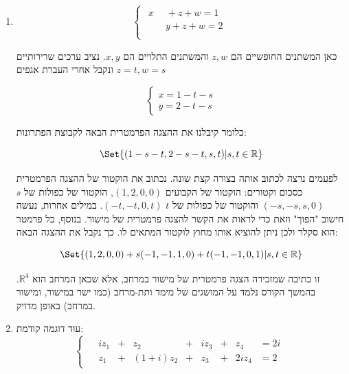 \documentclass[
  hebrew,
  12pt,
  a4paper,
  oneside]{book}
\theoremstyle{definition}
\theoremstyle{remark}
\theoremstyle{plain}
\theoremstyle{remark}
\begin{document}
\begin{example}
\begin{enumerate}
  זו ממ"ל יחסית פשוטה בארבעה משתנים \(x,y,z,w\). אפשר להתייחס ל-\(w\)
  כמשתנה חופשי ואז כל שאר המשתנים תלויים בו. נשתמש בפרמטר \(t\), נציב
  \(w=t\) במשוואות ואז נחסיר \(t\) מכל אגף בכל משוואה. כך נקבל
  \[\begin{cases}
  x=1-t\\
  y=2-t\\
  z=3-t
  \end{cases}\]

  לכן קבוצת הפתרונות של הממ"ל היא
  \[.\Set{(1-t,2-t,3-t,t)|t\in\mathbb R}=\Set{(1,2,3,0)+t(-1,-1,-1,1)|t\in\mathbb R}\]

  אפשר לנסות לדמיין קבוצה זו כישר במרחב \(\mathbb R^4\) הארבע-מימדי. זה
  בהחלט לא משהו שרואים ביום-יום כי העולם המוכר הוא תלת-מימדי, אבל זו
  עדיין הצגה אלגברית של ישר חד-מימדי. זה נובע מכך שיש משתנה חופשי יחיד,
  ומכאן הפרמטר \(t\). אם לצורך העניין היה פרמטר נוסף בהצגה הפרמטרית
  (בקבוצת הפתרונות של ממ"ל אחרת), הקבוצה הייתה "נראית" כמו מישור ב-
  \(\mathbb R^{4}\) ככל שאפשר לדמיין אותו. נראה מקרה כזה בדוגמה הבאה.
\item
  \[\begin{cases}
  \begin{aligned}
  x\phantom{+y}+z+w=1\\
  \phantom{x+}y+z+w=2\\
  \end{aligned}
  \end{cases}\]

  כאן המשתנים החופשיים הם \(z,w\) והמשתנים התלויים הם \(x,y\). נציב
  ערכים שרירותיים \(z=t, w=s\) ונקבל אחרי העברת אגפים

  \[\begin{cases}
  x=1-t-s \\
  y=2-t-s
  \end{cases}\]

  כלומר קיבלנו את ההצגה הפרמטרית הבאה לקבוצת הפתרונות:

  \[\Set{(1-s-t,2-s-t,s,t)|s,t\in\mathbb R}\]

  לפעמים נרצה לכתוב אותה בצורה קצת שונה. נכתוב את הוקטור של ההצגה
  הפרמטרית כסכום וקטורים: הוקטור של הקבועים \((1,2,0,0)\), הוקטור של
  כפולות של \(s\) \((-s,-s,s,0)\) והוקטור של כפולות של \(t\)
  \((-t,-t,0,t)\). במילים אחרות, נעשה חישוב "הפוך" וזאת כדי לראות את
  הקשר להצגה פרמטרית של מישור. בנוסף, כל פרמטר הוא סקלר ולכן ניתן להוציא
  אותו מחוץ לוקטור המתאים לו. כך נקבל את ההצגה הבאה:

  \[\Set{(1,2,0,0)+s(-1,-1,1,0)+t(-1,-1,0,1)|s,t\in\mathbb R}\]

  זו כתיבה שמזכירה הצגה פרמטרית של מישור במרחב, אלא שכאן המרחב הוא
  \(\mathbb R^{4}\). בהמשך הקורס נלמד על המושגים של מימד ותת-מרחב (כמו
  ישר במישור, ומישור במרחב) באופן מדויק.
\item
  עוד דוגמה קודמת: \[\begin{cases}
  \begin{alignedat}{8}
   & i z_1  &{}+{}&      z_2 &{}+{}&  i z_3 &{}+{}&     z_4 &= 2i \\[4pt]
   &   z_1  &{}+{}& (1+i)z_2 &{}+{}&      z_3 &{}+{}& 2i z_4 &= 2
  \end{alignedat}
  \end{cases}\]


\end{enumerate}
\end{example}
\end{document}
